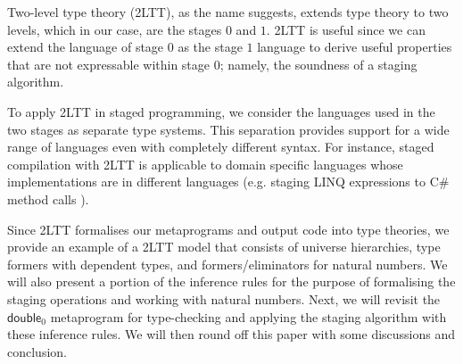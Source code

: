 
Two-level type theory (2LTT), as the name suggests, extends type theory to two levels, which in our case, are the stages $0$ and $1$. 2LTT is useful since we can extend the language of stage $0$ as the stage $1$ language to derive useful properties that are not expressable within stage $0$; namely, the soundness of a staging algorithm.

To apply 2LTT in staged programming, we consider the languages used in the two stages as separate type systems. This separation provides support for a wide range of languages even with completely different syntax. For instance, staged compilation with 2LTT is applicable to domain specific languages whose implementations are in different languages (e.g. staging LINQ expressions to C\# method calls \cite{linq}). %

Since 2LTT formalises our metaprograms and output code into type theories, we provide an example of a 2LTT model that consists of universe hierarchies, type formers with dependent types, and formers/eliminators for natural numbers. We will also present a portion of the inference rules for the purpose of formalising the staging operations and working with natural numbers. Next, we will revisit the $\mathsf{double}_0$ metaprogram for type-checking and applying the staging algorithm with these inference rules. We will then round off this paper with some discussions and conclusion.

